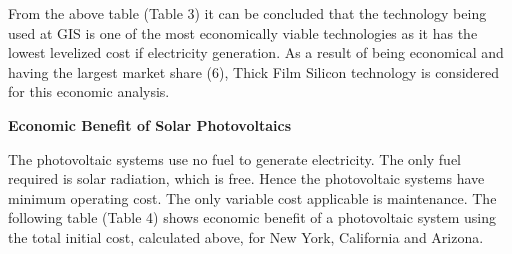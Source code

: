 \documentclass[12pt]{article}
\begin{document}


\vspace{\baselineskip}
\begin{justify}
From the above table (Table 3) it can be concluded that the technology being used at GIS is one of the most economically viable technologies as it has the lowest levelized cost if electricity generation. As a result of being economical and having the largest market share (6), Thick Film Silicon technology is considered for this economic analysis.
\end{justify}\par




\newpage

\vspace{\baselineskip}\textbf{Economic Benefit of Solar Photovoltaics}\par


\vspace{\baselineskip}
\begin{justify}
The photovoltaic systems use no fuel to generate electricity. The only fuel required is solar radiation, which is free. Hence the photovoltaic systems have minimum operating cost. The only variable cost applicable is maintenance. The following table (Table 4) shows economic benefit of a photovoltaic system using the total initial cost, calculated above, for New York, California and Arizona.
\end{justify}\par


\vspace{\baselineskip}
\par



\end{document}
